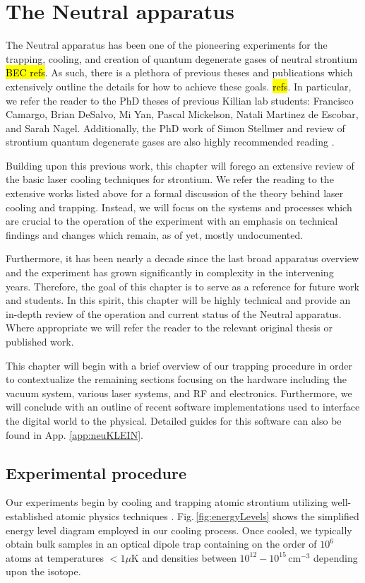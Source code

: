 \chapter{The Neutral apparatus}
\label{ch:chap2}

The Neutral apparatus has been one of the pioneering experiments for the trapping, cooling, and creation of quantum degenerate gases of neutral strontium \hl{BEC refs}. 
As such, there is a plethora of previous theses and publications which extensively outline the details for how to achieve these goals. \hl{refs}. 
In particular, we refer the reader to the PhD theses of previous Killian lab students: Francisco Camargo, Brian DeSalvo, Mi Yan, Pascal Mickelson, Natali Martinez de Escobar, and Sarah Nagel. 
Additionally, the PhD work of Simon Stellmer \cite{SimonStellmer2013} and review of strontium quantum degenerate gases are also highly recommended reading \cite{StellmerRev2013}.

Building upon this previous work, this chapter will forego an extensive review of the basic laser cooling techniques for strontium. 
We refer the reading to the extensive works listed above for a formal discussion of the theory behind laser cooling and trapping.
Instead, we will focus on the systems and processes which are crucial to the operation of the experiment with an emphasis on technical findings and changes which remain, as of yet, mostly undocumented.

Furthermore, it has been nearly a decade since the last broad apparatus overview \cite{MartinezdeEscolar2010} and the experiment has grown significantly in complexity in the intervening years.
Therefore, the goal of this chapter is to serve as a reference for future work and students. 
In this spirit, this chapter will be highly technical and provide an in-depth review of the operation and current status of the Neutral apparatus.
Where appropriate we will refer the reader to the relevant original thesis or published work.

This chapter will begin with a brief overview of our trapping procedure in order to contextualize the remaining sections focusing on the hardware including the vacuum system, various laser systems, and RF and electronics.
Furthermore, we will conclude with an outline of recent software implementations used to interface the digital world to the physical.
Detailed guides for this software can also be found in App. \ref{app:neuKLEIN}.

\section{Experimental procedure} \label{sec:trapping}
\setcounter{footnote}{0}
Our experiments begin by cooling and trapping atomic strontium utilizing well-established atomic physics techniques \cite{Metcalf1999,Katori1999,Ido2000,Nagel2003,Mukaiyama2003a,Loftus2004,mmy09a,sth09a,Mickelson2010ja,Tey2010a,dym10a,stg10}. 
Fig.\,\ref{fig:energyLevels} shows the simplified energy level diagram employed in our cooling process. 
Once cooled, we typically obtain bulk samples in an optical dipole trap containing on the order of $10^6$ atoms at temperatures $<1\mu$K and densities between $10^{12} - 10^{15}\,$cm$^{-3}$ depending upon the isotope. 

